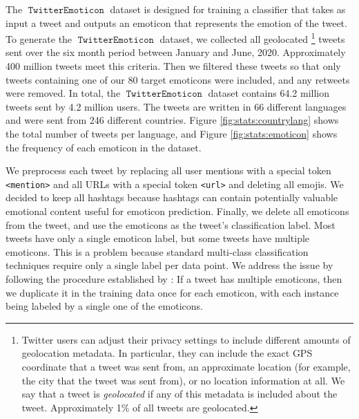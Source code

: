 \documentclass[11pt]{article}
\newcommand{\defn}[1]{\emph{{#1}}}
\newcommand{\bertmoji}{\texttt{BERTmoticon}}
\DeclareMathOperator{\emoticon}{\texttt{TwitterEmoticon}}
\begin{document}
The $\emoticon$ dataset is designed for training a classifier that takes as input a tweet and outputs an emoticon that represents the emotion of the tweet.
To generate the $\emoticon$ dataset, 
we collected all geolocated%
\footnote{
Twitter users can adjust their privacy settings to include different amounts of geolocation metadata.
In particular, they can include the exact GPS coordinate that a tweet was sent from,
an approximate location (for example, the city that the tweet was sent from),
or no location information at all.
We say that a tweet is \defn{geolocated} if any of this metadata is included about the tweet.
Approximately 1\% of all tweets are geolocated.
} 
tweets sent over the six month period between January and June, 2020.
Approximately 400 million tweets meet this criteria.
Then we filtered these tweets so that only tweets containing one of our 80 target emoticons were included,
and any retweets were removed.
In total, the $\emoticon$ dataset contains 64.2 million tweets sent by 4.2 million users.
The tweets are written in 66 different languages and were sent from 246 different countries.
Figure \ref{fig:stats:countrylang} shows the total number of tweets per language,
and Figure \ref{fig:stats:emoticon} shows the frequency of each emoticon in the dataset.

We preprocess each tweet by replacing all user mentions with a special token \texttt{<mention>} and all URLs with a special token \texttt{<url>} and deleting all emojis.
We decided to keep all hashtags because hashtags can contain potentially valuable emotional content useful for emoticon prediction.
Finally, we delete all emoticons from the tweet,
and use the emoticons as the tweet's classification label.
Most tweets have only a single emoticon label, but some tweets have multiple emoticons.
This is a problem because standard multi-class classification techniques require only a single label per data point.
We address the issue by following the procedure established by \cite{100_million_tweets}:
If a tweet has multiple emoticons,
then we duplicate it in the training data once for each emoticon,
with each instance being labeled by a single one of the emoticons.
\end{document}
